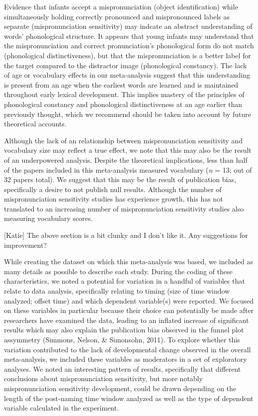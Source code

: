 \documentclass[man]{apa6}
\theoremstyle{definition}
\theoremstyle{definition}
\theoremstyle{definition}
\theoremstyle{remark}
\begin{document}
Evidence that infants accept a mispronunciation (object identification)
while simultaneously holding correctly pronounced and mispronounced
labels as separate (mispronunciation sensitivity) may indcate an
abstract understanding of words' phonological structure. It appears that
young infants may understand that the mispronunciation and correct
pronunciation's phonological form do not match (phonological
distinctiveness), but that the mispronunciation is a better label for
the target compared to the distractor image (phonological constancy).
The lack of age or vocabulary effects in our meta-analysis suggest that
this understanding is present from an age when the earliest words are
learned and is maintained throughout early lexical development. This
implies mastery of the principles of phonological constancy and
phonological distinctiveness at an age earlier than previously thought,
which we recommend should be taken into account by future theoretical
accounts.

Although the lack of an relationship between mispronunciation
sensitivity and vocabulary size may reflect a true effect, we note that
this may also be the result of an underpowered analysis. Despite the
theoretical implications, less than half of the papers included in this
meta-analysis measured vocabulary (\emph{n} = 13; out of 32 papers
total). We suggest that this may be the result of publication bias,
specifically a desire to not publish null results. Although the number
of mispronunciation sensitivity studies has experience growth, this has
not translated to an increasing number of mispronunciation sensitivity
studies also measuring vocabulary scores.

{[}Katie{]} The above section is a bit clunky and I don't like it. Any
suggestions for improvement?

While creating the dataset on which this meta-analysis was based, we
included as many details as possible to describe each study. During the
coding of these characteristics, we noted a potential for variation in a
handful of variables that relate to data analysis, specifically relating
to timing (size of time window analyzed; offset time) and which
dependent variable(s) were reported. We focused on these variables in
particular because their choice can potentially be made after
researchers have examined the data, leading to an inflated increase of
significant results which may also explain the publication bias observed
in the funnel plot assymmetry (Simmons, Nelson, \& Simonsohn, 2011). To
explore whether this variation contributed to the lack of developmental
change observed in the overall meta-analysis, we included these
variables as moderators in a set of exploratory analyses. We noted an
interesting pattern of results, specifically that different conclusions
about mispronunciation sensitivity, but more notably mispronunciation
sensitivity development, could be drawn depending on the length of the
post-naming time window analyzed as well as the type of dependent
variable calculated in the experiment.
\end{document}
